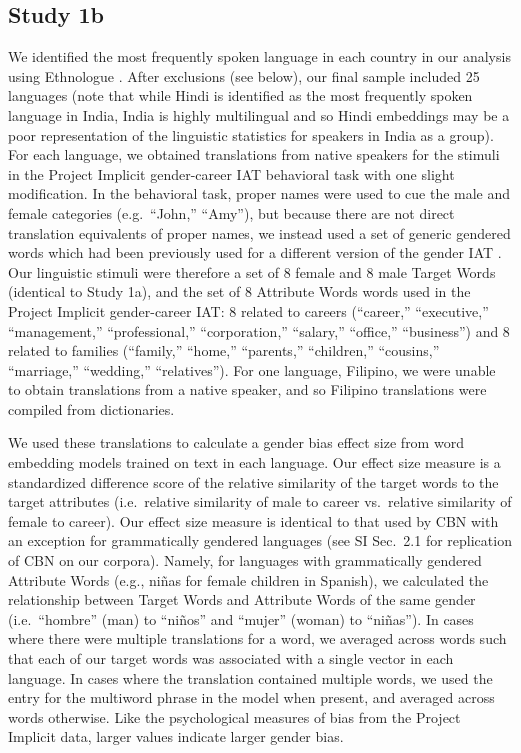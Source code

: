 \documentclass[9pt,twocolumn,twoside,lineno]{pnas-new}
\begin{document}
{\subsection*{Study 1b}



We identified the most frequently spoken language in each country in our
analysis using Ethnologue \cite{simons2018}. After exclusions
(see below), our final sample included 25
languages (note that while Hindi is identified as the most frequently spoken language in India, India is highly multilingual and so Hindi embeddings may be a poor representation of  the linguistic statistics for speakers in India as a group).
For each language, we obtained translations from native speakers for the
stimuli in the Project Implicit gender-career IAT behavioral task \cite{nosek2002harvesting} with one slight modification. In the behavioral task,
proper names were used to cue the male and female categories
(e.g.~\enquote{John,} \enquote{Amy}), but because there are not direct
translation equivalents of proper names, we instead used a set of
generic gendered words which had been previously used for a different
version of the gender IAT \citep[e.g., ``man,'' ``woman;''][]{nosek2002harvesting}. Our linguistic stimuli were therefore a set of 8 female and 8
male Target Words (identical to Study 1a), and the set of 8 Attribute
Words words used in the Project Implicit gender-career IAT: 8 related to
careers (\enquote{career,} \enquote{executive,} \enquote{management,}
\enquote{professional,} \enquote{corporation,} \enquote{salary,}
\enquote{office,} \enquote{business}) and 8 related to families
(\enquote{family,} \enquote{home,} \enquote{parents,}
\enquote{children,} \enquote{cousins,} \enquote{marriage,}
\enquote{wedding,} \enquote{relatives}). For one language, Filipino, we
were unable to obtain translations from a native speaker, and so
Filipino translations were compiled from dictionaries.

We used these translations to calculate a gender bias effect size from
word embedding models trained on text in each language. Our effect size
measure is a standardized difference score of the relative similarity of
the target words to the target attributes (i.e.~relative similarity of
male to career vs.~relative similarity of female to career). Our effect
size measure is identical to that used by CBN with an exception for
grammatically gendered languages (see SI Sec.\ 2.1 for replication of CBN on our
corpora). Namely, for languages with grammatically gendered Attribute
Words (e.g., niñas for female children in Spanish), we calculated the
relationship between Target Words and Attribute Words of the same gender
(i.e.~\enquote{hombre} (man) to \enquote{niños} and \enquote{mujer}
(woman) to \enquote{niñas}). In cases where there were multiple
translations for a word, we averaged across words such that each of our
target words was associated with a single vector in each language. In
cases where the translation contained multiple words, we used the entry
for the multiword phrase in the model when present, and averaged across
words otherwise. Like the psychological measures of bias from the
Project Implicit data, larger values indicate larger gender bias.

}
\end{document}
